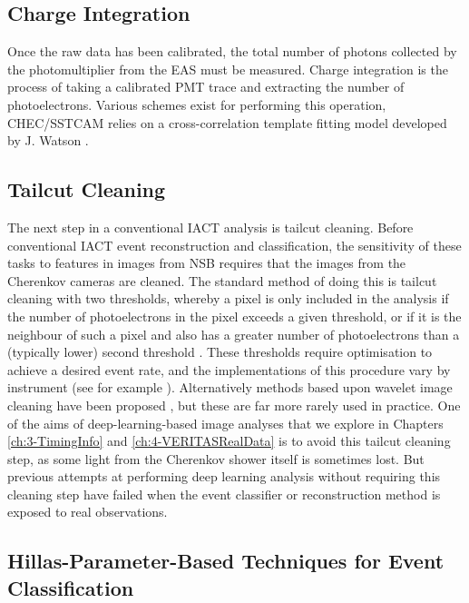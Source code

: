 \subsection{Charge Integration}

Once the raw data has been calibrated, the total number of photons collected by the photomultiplier from the EAS must be measured. Charge integration is the process of taking a calibrated PMT trace and extracting the number of photoelectrons. Various schemes exist for performing this operation, CHEC/SSTCAM relies on a cross-correlation template fitting model developed by J. Watson \cite{jasonthesis}.

\subsection{Tailcut Cleaning}

The next step in a conventional IACT analysis is tailcut cleaning. Before conventional IACT event reconstruction and classification, the sensitivity of these tasks to features in images from NSB requires that the images from the Cherenkov cameras are cleaned. The standard method of doing this is tailcut cleaning with two thresholds, whereby a pixel is only included in the analysis if the number of photoelectrons in the pixel exceeds a given threshold, or if it is the neighbour of such a pixel and also has a greater number of photoelectrons than a (typically lower) second threshold \cite{hegratailcut}. These thresholds require optimisation to achieve a desired event rate, and the implementations of this procedure vary by instrument (see for example \cite{Benbow,magictailcut,magictime}). Alternatively methods based upon wavelet image cleaning have been proposed \cite{wavelet}, but these are far more rarely used in practice. One of the aims of deep-learning-based image analyses that we explore in Chapters \ref{ch:3-TimingInfo} and \ref{ch:4-VERITASRealData} is to avoid this tailcut cleaning step, as some light from the Cherenkov shower itself is sometimes lost. But previous attempts at performing deep learning analysis without requiring this cleaning step have failed when the event classifier or reconstruction method is exposed to real observations. 

\subsection{Hillas-Parameter-Based Techniques for Event Classification}


